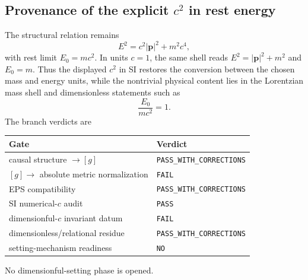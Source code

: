 \documentclass[11pt,a4paper]{article}
\begin{document}
\subsection{Provenance of the explicit \texorpdfstring{$c^2$}{c squared} in rest energy}
The structural relation remains
\begin{equation}
 E^2=c^2|\mathbf p|^2+m^2c^4,
\end{equation}
with rest limit $E_0=mc^2$. In units $c=1$, the same shell reads $E^2=|\mathbf p|^2+m^2$ and $E_0=m$. Thus the displayed $c^2$ in SI restores the conversion between the chosen mass and energy units, while the nontrivial physical content lies in the Lorentzian mass shell and dimensionless statements such as
\begin{equation}
 \frac{E_0}{mc^2}=1.
\end{equation}
The branch verdicts are
\begin{center}
\begin{tabular}{ll}
\toprule
Gate & Verdict\\
\midrule
causal structure $\to[g]$ & \texttt{PASS\_WITH\_CORRECTIONS}\\
$[g]\to$ absolute metric normalization & \texttt{FAIL}\\
EPS compatibility & \texttt{PASS\_WITH\_CORRECTIONS}\\
SI numerical-$c$ audit & \texttt{PASS}\\
dimensionful-$c$ invariant datum & \texttt{FAIL}\\
dimensionless/relational residue & \texttt{PASS\_WITH\_CORRECTIONS}\\
setting-mechanism readiness & \texttt{NO}\\
\bottomrule
\end{tabular}
\end{center}
No dimensionful-setting phase is opened.
\end{document}
